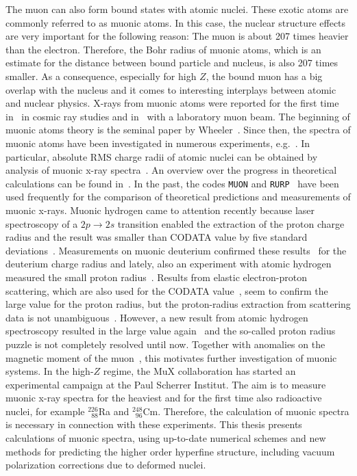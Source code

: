 The muon can also form bound states with atomic nuclei. These exotic atoms are commonly referred to as muonic atoms. In this case, the nuclear structure effects are very important for the following reason: The muon is about 207 times heavier than the electron. Therefore, the Bohr radius of muonic atoms, which is an estimate for the distance between bound particle and nucleus, is also 207 times smaller. As a consequence, especially for high $Z$, the bound muon has a big overlap with the nucleus and it comes to interesting interplays between atomic and nuclear physics. X-rays from muonic atoms were reported for the first time in~\cite{chang1949} in cosmic ray studies and in~\cite{fitch1953} with a laboratory muon beam. The beginning of muonic atoms theory is the seminal paper by Wheeler~\cite{wheeler1949}.  Since then, the spectra of muonic atoms have been investigated in numerous experiments, e.g.~\cite{hitlin1970,zehnder1975,powers1976,Yamazaki1978,tanaka1983,tanaka1984,tanaka1984_2,Bergem1988,
powers1977}. In particular, absolute RMS charge radii of atomic nuclei can be obtained by analysis of muonic x-ray spectra~\cite{FRICKE1995}. An overview over the progress in theoretical calculations can be found in~\cite{BorieRinker1982,Devons1995,wu1969}. In the past, the codes \texttt{MUON} and \texttt{RURP}~\cite{rinker1979} have been used frequently for the comparison of theoretical predictions and measurements of muonic x-rays. Muonic hydrogen came to attention recently because laser spectroscopy of a \mbox{\small{$2p\rightarrow 2s$}} transition enabled the extraction of the proton charge radius and the result was smaller than CODATA value by five standard deviations~\cite{Pohl2010,antognini2013}. Measurements on muonic deuterium confirmed these results~\cite{pohl2016} for the deuterium charge radius and lately, also an experiment with atomic hydrogen measured the small proton radius~\cite{beyer2017}.
Results from elastic electron-proton scattering, which are also used for the CODATA value~\cite{CODATA2014}, seem to confirm the large value for the proton radius, but the proton-radius extraction from scattering data is not unambiguous~\cite{arrington2015}. However, a new result from atomic hydrogen spectroscopy resulted in the large value again~\cite{fleurbaey2018} and the so-called proton radius puzzle is not completely resolved until now. Together with anomalies on the magnetic moment of the muon~\cite{bennett2006}, this motivates further investigation of muonic systems.\clearpage 
In the high-$Z$ regime, the MuX collaboration has started an experimental campaign at the Paul Scherrer Institut. 
The aim is to measure muonic x-ray spectra for the heaviest and for the first time also radioactive nuclei, for example $^{226}_{\phantom{1}88}$Ra and $^{248}_{\phantom{1}96}$Cm. 
Therefore, the calculation of muonic spectra is necessary in connection with these experiments. This thesis presents calculations of muonic spectra, using up-to-date numerical schemes and new methods for predicting the higher order hyperfine structure, including vacuum polarization corrections due to deformed nuclei.

